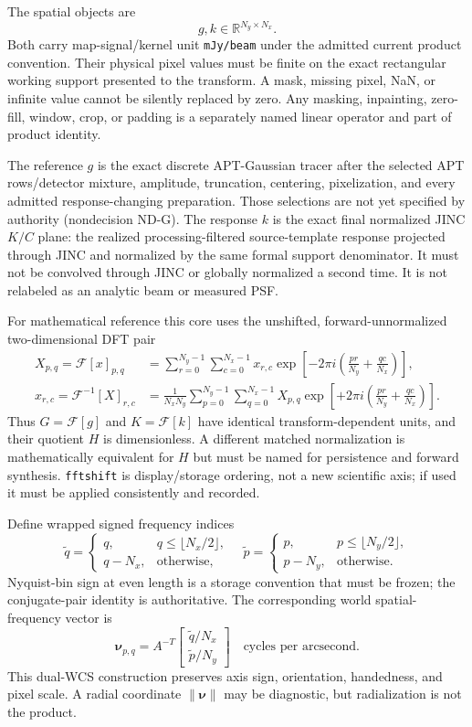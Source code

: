 \documentclass[11pt]{article}
\newcommand{\R}{\mathbb{R}}
\newcommand{\FFT}{\mathcal{F}}
\newcommand{\IFFT}{\mathcal{F}^{-1}}
\begin{document}
The spatial objects are
\[
 g,k\in\R^{N_y\times N_x}.
\]
Both carry map-signal/kernel unit \texttt{mJy/beam} under the admitted current
product convention.  Their physical pixel values must be finite on the exact
rectangular working support presented to the transform.  A mask, missing
pixel, NaN, or infinite value cannot be silently replaced by zero.  Any
masking, inpainting, zero-fill, window, crop, or padding is a separately named
linear operator and part of product identity.

The reference $g$ is the exact discrete APT-Gaussian tracer after the selected
APT rows/detector mixture, amplitude, truncation, centering, pixelization, and
every admitted response-changing preparation.  Those selections are not yet
specified by authority (nondecision ND-G).  The response $k$ is the exact final
normalized JINC $K/C$ plane: the realized processing-filtered source-template
response projected through JINC and normalized by the same formal support
denominator.  It must not be convolved through JINC or globally normalized a
second time.  It is not relabeled as an analytic beam or measured PSF.

For mathematical reference this core uses the unshifted, forward-unnormalized
two-dimensional DFT pair
\begin{align}
 X_{p,q}=\FFT[x]_{p,q}
 &=\sum_{r=0}^{N_y-1}\sum_{c=0}^{N_x-1}
 x_{r,c}\exp\!\left[-2\pi i\left(\frac{pr}{N_y}+\frac{qc}{N_x}\right)\right],\\
 x_{r,c}=\IFFT[X]_{r,c}
 &=\frac{1}{N_xN_y}\sum_{p=0}^{N_y-1}\sum_{q=0}^{N_x-1}
 X_{p,q}\exp\!\left[+2\pi i\left(\frac{pr}{N_y}+\frac{qc}{N_x}\right)\right].
\end{align}
Thus $G=\FFT[g]$ and $K=\FFT[k]$ have identical transform-dependent units,
and their quotient $H$ is dimensionless.  A different matched normalization
is mathematically equivalent for $H$ but must be named for persistence and
forward synthesis.  \texttt{fftshift} is display/storage ordering, not a new
scientific axis; if used it must be applied consistently and recorded.

Define wrapped signed frequency indices
\[
 \widetilde q=\begin{cases}q,&q\leq\lfloor N_x/2\rfloor,\\q-N_x,&\text{otherwise},\end{cases}
 \quad
 \widetilde p=\begin{cases}p,&p\leq\lfloor N_y/2\rfloor,\\p-N_y,&\text{otherwise}.
 \end{cases}
\]
Nyquist-bin sign at even length is a storage convention that must be frozen;
the conjugate-pair identity is authoritative.  The corresponding world
spatial-frequency vector is
\[
 \boldsymbol\nu_{p,q}=A^{-T}
 \begin{bmatrix}\widetilde q/N_x\\\widetilde p/N_y\end{bmatrix}
 \quad\text{cycles per arcsecond}.
\]
This dual-WCS construction preserves axis sign, orientation, handedness, and
pixel scale.  A radial coordinate $\|\boldsymbol\nu\|$ may be diagnostic, but
radialization is not the product.
\end{document}
